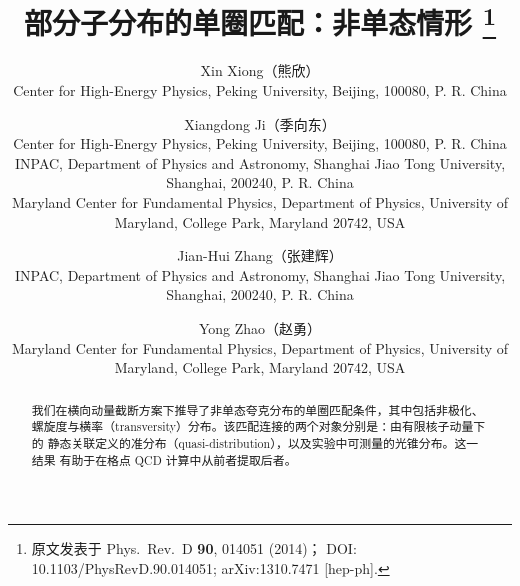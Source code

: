 \documentclass[11pt]{ctexart}
\begin{document}
\title{部分子分布的单圈匹配：非单态情形%
\thanks{原文发表于 Phys.\ Rev.\ D {\bf 90}, 014051 (2014)；
DOI: 10.1103/PhysRevD.90.014051; arXiv:1310.7471 [hep-ph].}}
\author{
Xin Xiong（熊欣）\\
{\small Center for High-Energy Physics, Peking University, Beijing, 100080, P. R. China}\\[3pt]
\and
Xiangdong Ji（季向东）\\
{\small Center for High-Energy Physics, Peking University, Beijing, 100080, P. R. China}\\
{\small INPAC, Department of Physics and Astronomy, Shanghai Jiao Tong University, Shanghai, 200240, P. R. China}\\
{\small Maryland Center for Fundamental Physics, Department of Physics, University of Maryland, College Park, Maryland 20742, USA}\\[3pt]
\and
Jian-Hui Zhang（张建辉）\\
{\small INPAC, Department of Physics and Astronomy, Shanghai Jiao Tong University, Shanghai, 200240, P. R. China}\\[3pt]
\and
Yong Zhao（赵勇）\\
{\small Maryland Center for Fundamental Physics, Department of Physics, University of Maryland, College Park, Maryland 20742, USA}
}

\date{}

\begin{abstract}
我们在横向动量截断方案下推导了非单态夸克分布的单圈匹配条件，其中包括非极化、
螺旋度与横率（transversity）分布。该匹配连接的两个对象分别是：由有限核子动量下的
静态关联定义的准分布（quasi-distribution），以及实验中可测量的光锥分布。这一结果
有助于在格点 QCD 计算中从前者提取后者。
\end{abstract}

\maketitle







\end{document}
